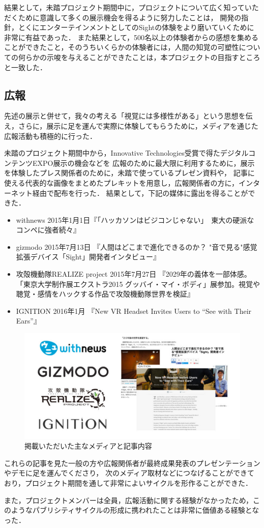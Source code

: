 結果として，未踏プロジェクト期間中に，プロジェクトについて広く知っていただくために意識して多くの展示機会を得るように努力したことは，
開発の指針，とくにエンターテインメントとしてのSightの体験をより磨いていくために非常に有益であった．
また結果として，500名以上の体験者からの感想を集めることができたこと，そのうちいくらかの体験者には，人間の知覚の可塑性についての何らかの示唆を与えることができたことは，本プロジェクトの目指すところと一致した．

\subsection{広報}
先述の展示と併せて，我々の考える「視覚には多様性がある」という思想を伝え，さらに，展示に足を運んで実際に体験してもらうために，メディアを通じた広報活動も積極的に行った．

未踏のプロジェクト期間中から，Innovative Technologies受賞で得たデジタルコンテンツEXPO展示の機会などを
広報のために最大限に利用するために，展示を体験したプレス関係者のために，未踏で使っているプレゼン資料や，
記事に使える代表的な画像をまとめたプレキットを用意し，広報関係者の方に，インターネット経由で配布を行った．
結果として，下記の媒体に露出を得ることができた．

\begin{itemize}
 \item withnews 2015年1月1日『「ハッカソンはビジコンじゃない」　東大の硬派なコンペに強者続々』
 \item gizmodo 2015年7月13日 『人間はどこまで進化できるのか？ "音で見る"感覚拡張デバイス「Sight」開発者インタビュー』
 \item 攻殻機動隊REALIZE project 2015年7月27日 『2029年の義体を一部体感。「東京大学制作展エクストラ2015 グッバイ・マイ・ボディ」展参加。視覚や聴覚・感情をハックする作品で攻殻機動隊世界を検証』
 \item IGNITION 2016年1月 『New VR Headset Invites Users to “See with Their Ears”』
\end{itemize}

\begin{figure}[h]
\begin{center}
\includegraphics[width=120mm, bb=0 0 674 330]{images/publicity/publicity.png}
\caption{掲載いただいた主なメディアと記事内容}
\end{center}
\end{figure}


これらの記事を見た一般の方や広報関係者が最終成果発表のプレゼンテーションやデモに足を運んでくださり，
次のメディア取材などにつなげることができており，プロジェクト期間を通して非常によいサイクルを形作ることができた．

また，プロジェクトメンバーは全員，広報活動に関する経験がなかったため，このようなパブリシティサイクルの形成に携われたことは非常に価値ある経験となった．








